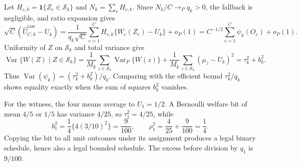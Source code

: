 Let \(H_{c,k}=\mathbf1\{Z_c\in\mathcal S_k\}\) and \(N_k=\sum_cH_{c,k}\).  Since \(N_k/C\to_Pq_k>0\), the fallback is negligible, and ratio expansion gives
\[
 \sqrt C(\widehat U^{\mathrm{raw}}_{C,k}-U_k)
 =\frac1{q_k\sqrt C}\sum_{c=1}^CH_{c,k}\{W_c(Z_c)-U_k\}+o_P(1)
 =C^{-1/2}\sum_{c=1}^C\psi_k(O_c)+o_P(1). \tag{24}
\]
Uniformity of \(Z\) on \(\mathcal S_k\) and total variance give
\[
 \operatorname{Var}\{W(Z)\mid Z\in\mathcal S_k\}
 =\frac1{M_k}\sum_{z\in\mathcal S_k}\operatorname{Var}_P\{W(z)\}
 +\frac1{M_k}\sum_{z\in\mathcal S_k}(\mu_z-U_k)^2
 =\tau_k^2+b_k^2. \tag{25}
\]
Thus \(\operatorname{Var}(\psi_k)=(\tau_k^2+b_k^2)/q_k\).  Comparing with the efficient bound \(\tau_k^2/q_k\) shows equality exactly when the sum of squares \(b_k^2\) vanishes.

For the witness, the four means average to \(U_1=1/2\).  A Bernoulli welfare bit of mean \(4/5\) or \(1/5\) has variance \(4/25\), so \(\tau_1^2=4/25\), while
\[
 b_1^2=\frac14\{4(3/10)^2\}=\frac9{100},\qquad
 \rho_1^2=\frac4{25}+\frac9{100}=\frac14. \tag{26}
\]
Copying the bit to all unit outcomes under its assignment produces a legal binary schedule, hence also a legal bounded schedule.  The excess before division by \(q_1\) is \(9/100\).